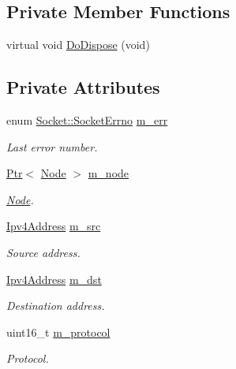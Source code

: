 \subsection*{Private Member Functions}
\begin{DoxyCompactItemize}
\item 
virtual void \hyperlink{classns3_1_1Ipv4RawSocketImpl_a31afca0d33e216abc3077b76880b47e7}{Do\+Dispose} (void)
\end{DoxyCompactItemize}
\subsection*{Private Attributes}
\begin{DoxyCompactItemize}
\item 
enum \hyperlink{classns3_1_1Socket_ada1328c5ae0c28cb2a982caf8f6d6cca}{Socket\+::\+Socket\+Errno} \hyperlink{classns3_1_1Ipv4RawSocketImpl_aae08c8798140ad6193ad2fc7ab1efbed}{m\+\_\+err}
\begin{DoxyCompactList}\small\item\em Last error number. \end{DoxyCompactList}\item 
\hyperlink{classns3_1_1Ptr}{Ptr}$<$ \hyperlink{classns3_1_1Node}{Node} $>$ \hyperlink{classns3_1_1Ipv4RawSocketImpl_af8cdf6f27af43b69c0616b90e9f3af98}{m\+\_\+node}
\begin{DoxyCompactList}\small\item\em \hyperlink{classns3_1_1Node}{Node}. \end{DoxyCompactList}\item 
\hyperlink{classns3_1_1Ipv4Address}{Ipv4\+Address} \hyperlink{classns3_1_1Ipv4RawSocketImpl_a1881de88180f919a385b14db64b93932}{m\+\_\+src}
\begin{DoxyCompactList}\small\item\em Source address. \end{DoxyCompactList}\item 
\hyperlink{classns3_1_1Ipv4Address}{Ipv4\+Address} \hyperlink{classns3_1_1Ipv4RawSocketImpl_a36a7c8ea8152272b055706247b97bef2}{m\+\_\+dst}
\begin{DoxyCompactList}\small\item\em Destination address. \end{DoxyCompactList}\item 
uint16\+\_\+t \hyperlink{classns3_1_1Ipv4RawSocketImpl_a924effb0eb9a6cbbf1daeb3a7b7ffc94}{m\+\_\+protocol}
\begin{DoxyCompactList}\small\item\em Protocol. \end{DoxyCompactList}\item 

\end{DoxyCompactItemize}
